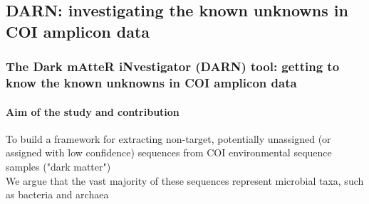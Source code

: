 \documentclass{beamer}
\begin{document}

   \begin{darkframes}
      \subsection{DARN: investigating the known unknowns in COI amplicon data}
   \end{darkframes}
   
   \begin{darkframes}
      \begin{frame}
         \frametitle{The Dark mAtteR iNvestigator (DARN) tool: getting to know
         the known unknowns in COI amplicon data}
         \framesubtitle{Aim of the study and contribution}

         To build a framework for extracting non-target, potentially unassigned 
         (or assigned with low confidence) sequences from COI environmental
         sequence samples ("dark matter") \\
         \bigskip
         We argue that the vast majority of these sequences represent
         microbial taxa, such as bacteria and archaea

      \end{frame}
   \end{darkframes}
\end{document}
